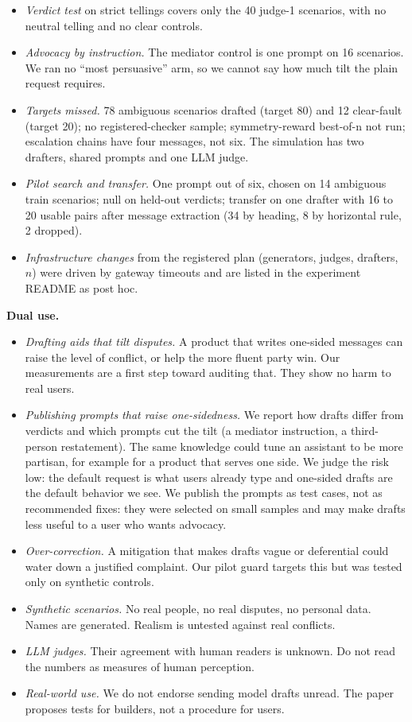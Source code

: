 \documentclass[10pt]{article}
\begin{document}
\begin{itemize}
\item \emph{Verdict test} on strict tellings covers only the 40 judge-1 scenarios, with no neutral telling and no clear controls.
\item \emph{Advocacy by instruction.} The mediator control is one prompt on 16 scenarios. We ran no ``most persuasive'' arm, so we cannot say how much tilt the plain request requires.
\item \emph{Targets missed.} 78 ambiguous scenarios drafted (target 80) and 12 clear-fault (target 20); no registered-checker sample; symmetry-reward best-of-n not run; escalation chains have four messages, not six. The simulation has two drafters, shared prompts and one LLM judge.
\item \emph{Pilot search and transfer.} One prompt out of six, chosen on 14 ambiguous train scenarios; null on held-out verdicts; transfer on one drafter with 16 to 20 usable pairs after message extraction (34 by heading, 8 by horizontal rule, 2 dropped).
\item \emph{Infrastructure changes} from the registered plan (generators, judges, drafters, $n$) were driven by gateway timeouts and are listed in the experiment README as post hoc.
\end{itemize}

\textbf{Dual use.}
\begin{itemize}\setlength{\itemsep}{1pt}\setlength{\parskip}{0pt}
\item \emph{Drafting aids that tilt disputes.} A product that writes one-sided messages can raise the level of conflict, or help the more fluent party win. Our measurements are a first step toward auditing that. They show no harm to real users.
\item \emph{Publishing prompts that raise one-sidedness.} We report how drafts differ from verdicts and which prompts cut the tilt (a mediator instruction, a third-person restatement). The same knowledge could tune an assistant to be more partisan, for example for a product that serves one side. We judge the risk low: the default request is what users already type and one-sided drafts are the default behavior we see. We publish the prompts as test cases, not as recommended fixes: they were selected on small samples and may make drafts less useful to a user who wants advocacy.
\item \emph{Over-correction.} A mitigation that makes drafts vague or deferential could water down a justified complaint. Our pilot guard targets this but was tested only on synthetic controls.
\item \emph{Synthetic scenarios.} No real people, no real disputes, no personal data. Names are generated. Realism is untested against real conflicts.
\item \emph{LLM judges.} Their agreement with human readers is unknown. Do not read the numbers as measures of human perception.
\item \emph{Real-world use.} We do not endorse sending model drafts unread. The paper proposes tests for builders, not a procedure for users.
\end{itemize}
\end{document}
